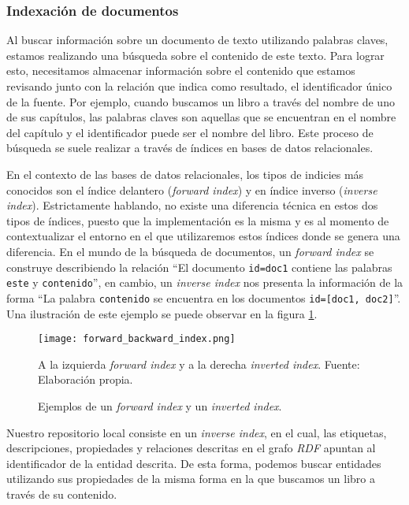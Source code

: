 \subsubsection{Indexación de documentos}
\label{sec:index-types}

Al buscar información sobre un documento de texto utilizando palabras claves,
estamos realizando una búsqueda sobre el contenido de este texto. Para lograr
esto, necesitamos almacenar información sobre el contenido que estamos revisando
junto con la relación que indica como resultado, el identificador único de la
fuente. Por ejemplo, cuando buscamos un libro a través del nombre de uno de sus
capítulos, las palabras claves son aquellas que se encuentran en el nombre del
capítulo y el identificador puede ser el nombre del libro. Este proceso de
búsqueda se suele realizar a través de índices en bases de datos relacionales.

En el contexto de las bases de datos relacionales, los tipos de indicies más
conocidos son el índice delantero (\textit{forward index}) y en índice inverso
(\textit{inverse index}). Estrictamente hablando, no existe una diferencia
técnica en estos dos tipos de índices, puesto que la implementación es la misma
y es al momento de contextualizar el entorno en el que utilizaremos estos
índices donde se genera una diferencia. En el mundo de la búsqueda de
documentos, un \textit{forward index} se construye describiendo la relación
``El documento \texttt{id=doc1} contiene las palabras \texttt{este} y
\texttt{contenido}'', en cambio, un \textit{inverse index} nos presenta la
información de la forma ``La palabra \texttt{contenido} se encuentra en los
documentos \texttt{id=[doc1, doc2]}''. Una ilustración de este ejemplo se puede
observar en la figura \ref{fig:forward-backward-index}.

\begin{figure}
    \centering
    \texttt{[image: forward\_backward\_index.png]}
    \caption{Ejemplos de un \textit{forward index} y un \textit{inverted
    index}.} A la izquierda \textit{forward index} y a la derecha
    \textit{inverted index}. Fuente: Elaboración propia.
    \label{fig:forward-backward-index}
\end{figure}

Nuestro repositorio local consiste en un \textit{inverse index}, en el cual, las
etiquetas, descripciones, propiedades y relaciones descritas en el grafo
\textit{RDF} apuntan al identificador de la entidad descrita. De esta forma,
podemos buscar entidades utilizando sus propiedades de la misma forma en la que
buscamos un libro a través de su contenido.

